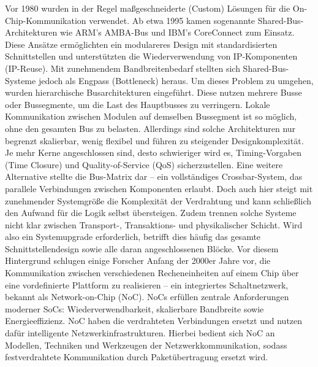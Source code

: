 Vor 1980 wurden in der Regel maßgeschneiderte (Custom) Lösungen für die On-Chip-Kommunikation verwendet. Ab etwa 1995 kamen sogenannte Shared-Bus-Architekturen wie ARM's AMBA-Bus und IBM's CoreConnect zum Einsatz. Diese Ansätze ermöglichten ein modulareres Design mit standardisierten Schnittstellen und unterstützten die Wiederverwendung von IP-Komponenten (IP-Reuse).
Mit zunehmendem Bandbreitenbedarf stellten sich Shared-Bus-Systeme jedoch als Engpass (Bottleneck) heraus. Um dieses Problem zu umgehen, wurden hierarchische Busarchitekturen eingeführt. Diese nutzen mehrere Busse oder Bussegmente, um die Last des Hauptbusses zu verringern. Lokale Kommunikation zwischen Modulen auf demselben Bussegment ist so möglich, ohne den gesamten Bus zu belasten. Allerdings sind solche Architekturen nur begrenzt skalierbar, wenig flexibel und führen zu steigender Designkomplexität. Je mehr Kerne angeschlossen sind, desto schwieriger wird es, Timing-Vorgaben (Time Closure) und Quality-of-Service (QoS) sicherzustellen.
Eine weitere Alternative stellte die Bus-Matrix dar – ein vollständiges Crossbar-System, das parallele Verbindungen zwischen Komponenten erlaubt. Doch auch hier steigt mit zunehmender Systemgröße die Komplexität der Verdrahtung und kann schließlich den Aufwand für die Logik selbst übersteigen. Zudem trennen solche Systeme nicht klar zwischen Transport-, Transaktions- und physikalischer Schicht. Wird also ein Systemupgrade erforderlich, betrifft dies häufig das gesamte Schnittstellendesign sowie alle daran angeschlossenen Blöcke.
Vor diesem Hintergrund schlugen einige Forscher Anfang der 2000er Jahre vor, die Kommunikation zwischen verschiedenen Recheneinheiten auf einem Chip über eine vordefinierte Plattform zu realisieren – ein integriertes Schaltnetzwerk, bekannt als Network-on-Chip (NoC). NoCs erfüllen zentrale Anforderungen moderner SoCs: Wiederverwendbarkeit, skalierbare Bandbreite sowie Energieeffizienz. NoC haben die verdrahteten Verbindungen ersetzt und nutzen dafür intelligente Netzwerkinfrastrukturen. Hierbei bedient sich NoC an Modellen, Techniken und Werkzeugen der Netzwerkkommunikation, sodass festverdrahtete Kommunikation durch Paketübertragung ersetzt wird.

